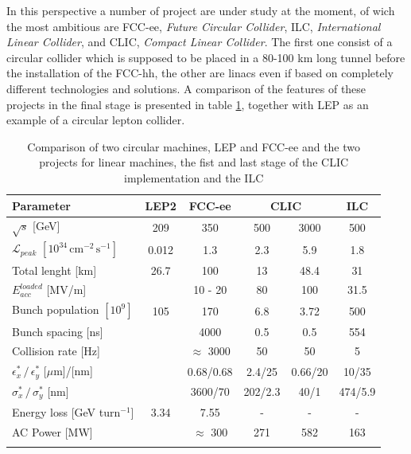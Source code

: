 In this perspective a number of project are under study at the moment, of wich the most ambitious are FCC-ee, \textit{Future Circular Collider}, ILC, \textit{International Linear Collider}, and CLIC, \textit{Compact Linear Collider}. The first one consist of a circular collider which is supposed to be placed in a 80-100 km long tunnel before the installation of the FCC-hh, the other are linacs even if based on completely different technologies and solutions.  A comparison of the features of these projects in the final stage is presented in table \ref{table_CLIC_ILC_FCC}, together with LEP as an example of a circular lepton collider.

\begin{table}
  \centering
    \begin{tabular}{ l c c | c c c }
    \hline
    \hline
    \textbf{Parameter}								& \textbf{LEP2}	&	\textbf{FCC-ee}	&  \multicolumn{2}{c}{\textbf{CLIC}}	&	\textbf{ILC}	\\
    \hline
    $\sqrt{s}$ [GeV]								& 209	& 350  			&  	500	&  3000	& 500	\\
    $\mathscr{L}_{peak}$  $[10^{34} \, \text{cm}^{-2} \, \text{s}^{-1}]$	&0.012	& 1.3				&  	2.3	& 	5.9	&1.8		\\
    Total lenght [km]								&26.7	& 100			& 13		&  48.4	& 31		\\
    $E_{acc}^{loaded}$ [MV/m]						&		& 10 - 20			& 80		& 100 	& 31.5	\\
    Bunch population $[10^9]$						& 105	& 170  			&  6.8	& 	3.72	& 500	\\
    Bunch spacing [ns]							& 		& 4000	  		&  	0.5	& 	0.5	& 554	\\
    Collision rate [Hz]								&  		&$\approx$ 3000	&  	50	& 	50	& 5		\\
    $\epsilon^*_x \, / \, \epsilon^*_y $ [$\mu$m]/[nm]		& 		&  	0.68/0.68	        		&  2.4/25	& 0.66/20	& 10/35	\\  
    $\sigma^*_x\, / \, \sigma^*_y$ [nm]				& 		&  	3600/70		&  202/2.3	& 40/1	&474/5.9	\\    
    Energy loss [GeV turn$^{-1}$]					&  3.34	& 	7.55			& - 		& -		& -		\\
    AC Power [MW]								&  		& $\approx$ 300		& 271	& 582	& 163	\\
    \hline
    \hline
    \label{CLIC_param_table}
    \end{tabular}
  \caption{Comparison of two circular machines, LEP\cite{FCC-ee:leptonCollParam} and FCC-ee\cite{FCC-ee:leptonCollParam,Zimmermann:2057706} and the two projects for linear machines, the fist and last stage of the CLIC implementation \cite{CLIC:cdr} and the ILC\cite{ILC:tdr} }\label{table_CLIC_ILC_FCC}
\end{table}



